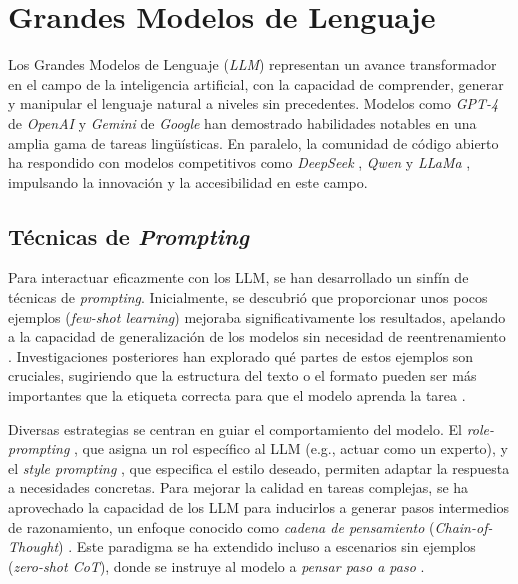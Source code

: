 \section{Grandes Modelos de Lenguaje}
\label{sec:llm}
Los Grandes Modelos de Lenguaje (\textit{LLM}) representan un avance transformador en el campo de la inteligencia artificial, con la capacidad de comprender, generar y manipular el lenguaje natural a niveles sin precedentes. Modelos como \textit{GPT-4} de \textit{OpenAI} \parencite{openaiGPT4TechnicalReport2024} y \textit{Gemini} de \textit{Google} \parencite{teamGeminiFamilyHighly2024} han demostrado habilidades notables en una amplia gama de tareas lingüísticas. En paralelo, la comunidad de código abierto ha respondido con modelos competitivos como \textit{DeepSeek} \parencite{deepseek-aiDeepSeekV3TechnicalReport2024}, \textit{Qwen} \parencite{baiQwenTechnicalReport2023} y \textit{LLaMa} \parencite{grattafioriLlama3Herd2024}, impulsando la innovación y la accesibilidad en este campo.

\subsection{Técnicas de \textit{Prompting}}
\label{subsec:prompting_techniques}
Para interactuar eficazmente con los LLM, se han desarrollado un sinfín de técnicas de \textit{prompting}. Inicialmente, se descubrió que proporcionar unos pocos ejemplos (\textit{few-shot learning}) mejoraba significativamente los resultados, apelando a la capacidad de generalización de los modelos sin necesidad de reentrenamiento \parencite{brownLanguageModelsAre2020}. Investigaciones posteriores han explorado qué partes de estos ejemplos son cruciales, sugiriendo que la estructura del texto o el formato pueden ser más importantes que la etiqueta correcta para que el modelo aprenda la tarea \parencite{minRethinkingRoleDemonstrations2022}.

Diversas estrategias se centran en guiar el comportamiento del modelo. El \textit{role-prompting} \parencite{kongBetterZeroShotReasoning2024}, que asigna un rol específico al LLM (e.g., actuar como un experto), y el \textit{style prompting} \parencite{luBoundingCapabilitiesLarge2023}, que especifica el estilo deseado, permiten adaptar la respuesta a necesidades concretas. Para mejorar la calidad en tareas complejas, se ha aprovechado la capacidad de los LLM para inducirlos a generar pasos intermedios de razonamiento, un enfoque conocido como \textit{cadena de pensamiento} (\textit{Chain-of-Thought}) \parencite{nyeShowYourWork2021, weiChainofThoughtPromptingElicits2023}. Este paradigma se ha extendido incluso a escenarios sin ejemplos (\textit{zero-shot CoT}), donde se instruye al modelo a \textit{pensar paso a paso} \parencite{kojimaLargeLanguageModels2023, wangPlanandSolvePromptingImproving2023}.


